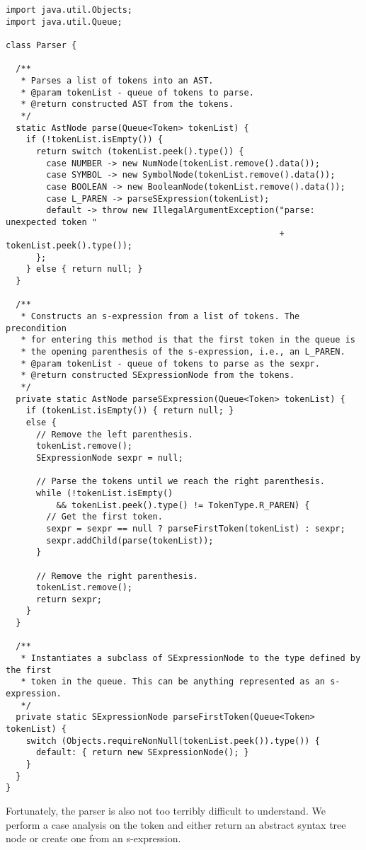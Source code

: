 \begin{lstlisting}[language=MyJava]
import java.util.Objects;
import java.util.Queue;

class Parser {

  /**
   * Parses a list of tokens into an AST.
   * @param tokenList - queue of tokens to parse.
   * @return constructed AST from the tokens.
   */
  static AstNode parse(Queue<Token> tokenList) {
    if (!tokenList.isEmpty()) {
      return switch (tokenList.peek().type()) {
        case NUMBER -> new NumNode(tokenList.remove().data());
        case SYMBOL -> new SymbolNode(tokenList.remove().data());
        case BOOLEAN -> new BooleanNode(tokenList.remove().data());
        case L_PAREN -> parseSExpression(tokenList);
        default -> throw new IllegalArgumentException("parse: unexpected token " 
                                                      + tokenList.peek().type());
      };
    } else { return null; }
  }

  /**
   * Constructs an s-expression from a list of tokens. The precondition
   * for entering this method is that the first token in the queue is
   * the opening parenthesis of the s-expression, i.e., an L_PAREN.
   * @param tokenList - queue of tokens to parse as the sexpr.
   * @return constructed SExpressionNode from the tokens.
   */
  private static AstNode parseSExpression(Queue<Token> tokenList) {
    if (tokenList.isEmpty()) { return null; }
    else {
      // Remove the left parenthesis.
      tokenList.remove();
      SExpressionNode sexpr = null;

      // Parse the tokens until we reach the right parenthesis.
      while (!tokenList.isEmpty() 
          && tokenList.peek().type() != TokenType.R_PAREN) {
        // Get the first token.
        sexpr = sexpr == null ? parseFirstToken(tokenList) : sexpr;
        sexpr.addChild(parse(tokenList));
      }

      // Remove the right parenthesis.
      tokenList.remove();
      return sexpr;
    }
  }

  /**
   * Instantiates a subclass of SExpressionNode to the type defined by the first
   * token in the queue. This can be anything represented as an s-expression.
   */
  private static SExpressionNode parseFirstToken(Queue<Token> tokenList) {
    switch (Objects.requireNonNull(tokenList.peek()).type()) {
      default: { return new SExpressionNode(); }
    }
  }
}
\end{lstlisting}

Fortunately, the parser is also not too terribly difficult to understand. 
We perform a case analysis on the token and either return an abstract syntax tree node or create one from an s-expression.

